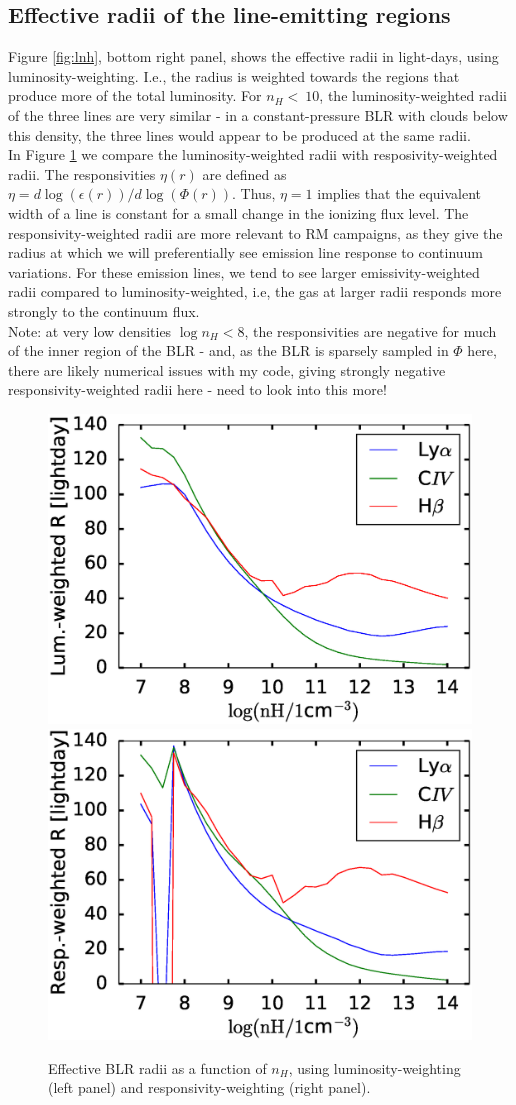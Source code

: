 \documentclass[paper=a4, fontsize=11pt]{scrartcl} %
\numberwithin{equation}{section} %
\numberwithin{figure}{section} %
\numberwithin{table}{section} %
\begin{document}
 



\subsection{Effective radii of the line-emitting regions}

Figure \ref{fig:lnh}, bottom right panel, shows the effective radii in light-days, using luminosity-weighting. I.e., the radius is weighted towards the regions that produce more of the total luminosity. For $n_H<~10$, the luminosity-weighted radii of the three lines are very similar - in a constant-pressure BLR with clouds below this density, the three lines would appear to be produced at the same radii.\\

In Figure \ref{fig:em-weghted} we compare the luminosity-weighted radii with resposivity-weighted radii. The responsivities $\eta(r)$ are defined as $\eta=d\log(\epsilon(r))/d\log(\Phi(r))$. Thus, $\eta=1$ implies that the equivalent width of a line is constant for a small change in the ionizing flux level. The responsivity-weighted radii are more relevant to RM campaigns, as they give the radius at which we will preferentially see emission line response to continuum variations. For these emission lines, we tend to see larger emissivity-weighted radii compared to luminosity-weighted, i.e, the gas at larger radii responds more strongly to the continuum flux.\\ 

Note: at very low densities $\log n_H<8$, the responsivities are negative for much of the inner region of the BLR - and, as the BLR is sparsely sampled in $\Phi$ here, there are likely numerical issues with my code, giving strongly negative responsivity-weighted radii here - need to look into this more!

\begin{figure}
	\centering
	\includegraphics[width=0.49\linewidth]{RL_nH}
	\includegraphics[width=0.49\linewidth]{RR_nH}
	\caption{Effective BLR radii as a function of $n_H$, using luminosity-weighting (left panel) and responsivity-weighting (right panel).}
\label{fig:em-weghted}
\end{figure}
\end{document}

